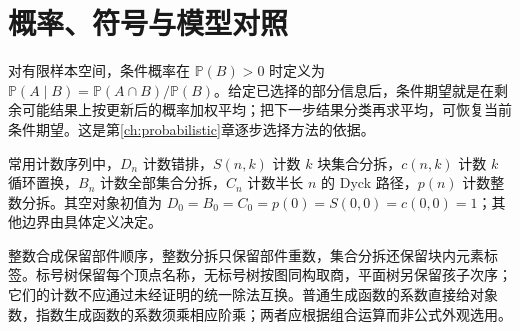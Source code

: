 \section{概率、符号与模型对照}

对有限样本空间，条件概率在 $\mathbb P(B)>0$ 时定义为 $\mathbb P(A\mid B)=\mathbb P(A\cap B)/\mathbb P(B)$。给定已选择的部分信息后，条件期望就是在剩余可能结果上按更新后的概率加权平均；把下一步结果分类再求平均，可恢复当前条件期望。这是第\ref{ch:probabilistic}章逐步选择方法的依据。

常用计数序列中，$D_n$ 计数错排，$S(n,k)$ 计数 $k$ 块集合分拆，$c(n,k)$ 计数 $k$ 循环置换，$B_n$ 计数全部集合分拆，$C_n$ 计数半长 $n$ 的 Dyck 路径，$p(n)$ 计数整数分拆。其空对象初值为 $D_0=B_0=C_0=p(0)=S(0,0)=c(0,0)=1$；其他边界由具体定义决定。

整数合成保留部件顺序，整数分拆只保留部件重数，集合分拆还保留块内元素标签。标号树保留每个顶点名称，无标号树按图同构取商，平面树另保留孩子次序；它们的计数不应通过未经证明的统一除法互换。普通生成函数的系数直接给对象数，指数生成函数的系数须乘相应阶乘；两者应根据组合运算而非公式外观选用。


